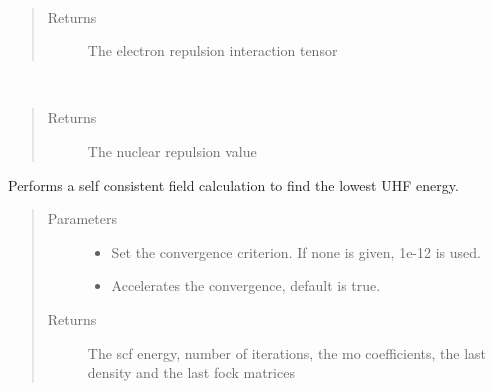 \documentclass[letterpaper,10pt,english]{sphinxmanual}
\begin{document}
\begin{fulllineitems}
\begin{fulllineitems}
\label{\detokenize{cUHF_s:hf.cUHF_s.CUHF.get_two_e}}~\begin{quote}\begin{description}
\item[{Returns}] \leavevmode
The electron repulsion interaction tensor

\end{description}\end{quote}

\end{fulllineitems}


\begin{fulllineitems}
\label{\detokenize{cUHF_s:hf.cUHF_s.CUHF.nuc_rep}}~\begin{quote}\begin{description}
\item[{Returns}] \leavevmode
The nuclear repulsion value

\end{description}\end{quote}

\end{fulllineitems}


\begin{fulllineitems}
\label{\detokenize{cUHF_s:hf.cUHF_s.CUHF.scf}}
Performs a self consistent field calculation to find the lowest UHF energy.
\begin{quote}\begin{description}
\item[{Parameters}] \leavevmode\begin{itemize}
\item {} 
 \textendash{} Set the convergence criterion. If none is given, 1e-12 is used.

\item {} 
 \textendash{} Accelerates the convergence, default is true.

\end{itemize}

\item[{Returns}] \leavevmode
The scf energy, number of iterations, the mo coefficients, the last density and the last fock matrices

\end{description}\end{quote}

\end{fulllineitems}


\end{fulllineitems}
\end{document}
